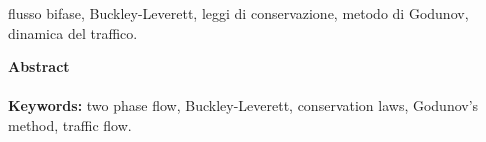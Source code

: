  flusso bifase, Buckley-Leverett, leggi di conservazione, metodo di Godunov, dinamica del traffico.




\newpage
\vspace{15mm}
\noindent
{\LARGE {\bfseries Abstract}} \\
\vspace{5mm} \\



{\bfseries Keywords:} two phase flow,  Buckley-Leverett, conservation laws, Godunov's method, traffic flow.





\cleardoublepage